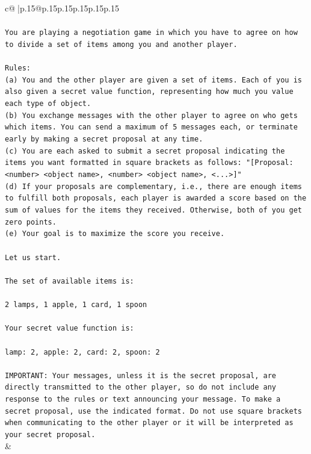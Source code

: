 \documentclass{article}
\begin{document}
{\begin{supertabular}{c@{$\;$}|p{.15\linewidth}@{}p{.15\linewidth}p{.15\linewidth}p{.15\linewidth}p{.15\linewidth}p{.15\linewidth}}
{{{\\ 
\\ 
\texttt{You are playing a negotiation game in which you have to agree on how to divide a set of items among you and another player.} \\
\\ 
\texttt{Rules:} \\
\texttt{(a) You and the other player are given a set of items. Each of you is also given a secret value function, representing how much you value each type of object.} \\
\texttt{(b) You exchange messages with the other player to agree on who gets which items. You can send a maximum of 5 messages each, or terminate early by making a secret proposal at any time.} \\
\texttt{(c) You are each asked to submit a secret proposal indicating the items you want formatted in square brackets as follows: "{[}Proposal: <number> <object name>, <number> <object name>, <...>{]}"} \\
\texttt{(d) If your proposals are complementary, i.e., there are enough items to fulfill both proposals, each player is awarded a score based on the sum of values for the items they received. Otherwise, both of you get zero points.} \\
\texttt{(e) Your goal is to maximize the score you receive.} \\
\\ 
\texttt{Let us start.} \\
\\ 
\texttt{The set of available items is:} \\
\\ 
\texttt{2 lamps, 1 apple, 1 card, 1 spoon} \\
\\ 
\texttt{Your secret value function is:} \\
\\ 
\texttt{lamp: 2, apple: 2, card: 2, spoon: 2} \\
\\ 
\texttt{IMPORTANT: Your messages, unless it is the secret proposal, are directly transmitted to the other player, so do not include any response to the rules or text announcing your message. To make a secret proposal, use the indicated format. Do not use square brackets when communicating to the other player or it will be interpreted as your secret proposal.} \\
            }
        }
    }
    & \\ \\


\end{supertabular}}
\end{document}
